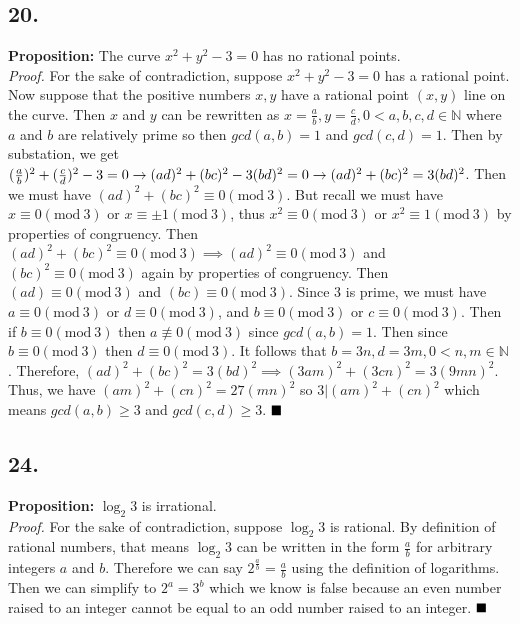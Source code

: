\documentclass[12pt]{article}
\begin{document}
\begin{minipage}[t]{0.45\textwidth}

	
\subsection*{20.}
\textbf{Proposition:} The curve $ x^2+y^2-3=0 $ has no rational points.
\\\textit{Proof.} For the sake of contradiction, suppose $ x^2+y^2-3=0 $ has a rational point. Now suppose that the positive numbers $ x,y $ have a rational point $ (x,y) $ line on the curve. Then $ x $ and $ y $ can be rewritten as $ x=\frac{a}{b}, y=\frac{c}{d}, 0<a, b, c, d\in \mathbb{N} $ where $ a $ and $ b $ are relatively prime so then $ gcd(a,b)=1 $ and $ gcd(c,d)=1 $. Then by substation, we get $ (\frac{a}{b})^2+(\frac{c}{d})^2-3=0\rightarrow (ad)^2+(bc)^2-3(bd)^2=0\\\rightarrow (ad)^2+(bc)^2=3(bd)^2 $. Then we must have $ (ad)^2+(bc)^2\equiv 0(\mathrm{mod}\ 3)$. But recall we must have $ x\equiv 0(\mathrm{mod}\ 3) $ or $  x\equiv \pm1(\mathrm{mod}\ 3)$, thus $ x^2\equiv 0(\mathrm{mod}\ 3) $ or $ x^2\equiv 1(\mathrm{mod}\ 3) $ by properties of congruency. Then $ (ad)^2+(bc)^2 \equiv 0(\mathrm{mod}\ 3) \implies (ad)^2\equiv 0(\mathrm{mod}\ 3)$ and $ (bc)^2\equiv 0(\mathrm{mod}\ 3) $ again by properties of congruency. Then $ (ad)\equiv 0(\mathrm{mod}\ 3)$ and $ (bc)\equiv 0(\mathrm{mod}\ 3) $. Since 3 is prime, we must have $ a\equiv0(\mathrm{mod}\ 3) $ or $ d\equiv0(\mathrm{mod}\ 3) $, and $ b\equiv0(\mathrm{mod}\ 3)$ or $ c\equiv0(\mathrm{mod}\ 3) $. Then if $ b\equiv0(\mathrm{mod}\ 3) $ then $ a\not\equiv0(\mathrm{mod}\ 3) $ since $ gcd(a,b)=1 $. Then since $ b\equiv0(\mathrm{mod}\ 3) $ then $ d\equiv0(\mathrm{mod}\ 3) $. It follows that $ b=3n, d=3m, 0<n,m\in \mathbb{N} $. Therefore, $ (ad)^2+(bc)^2=3(bd)^2 \implies (3am)^2+(3cn)^2=3(9mn)^2 $. Thus, we have $ (am)^2+(cn)^2=27(mn)^2 $ so $ 3|(am)^2+(cn)^2 $ which means $gcd(a,b)\geq3 $ and $ gcd(c,d)\geq3 $.
$ \hfill\blacksquare $

\subsection*{24.}
\textbf{Proposition:} $ \log_2 3 $ is irrational.
\\\textit{Proof.} For the sake of contradiction, suppose $ \log_2 3 $ is rational. By definition of rational numbers, that means $ \log_2 3 $ can be written in the form $ \frac{a}{b} $ for arbitrary integers $ a $ and $ b $.  Therefore we can say $ 2^\frac{a}{b} = \frac{a}{b}$ using the definition of logarithms. Then we can simplify to $ 2^a=3^b $ which we know is false because an even number raised to an integer cannot be equal to an odd number raised to an integer. 
$ \hfill\blacksquare $ 

\end{minipage}
\pagebreak

\end{document}
